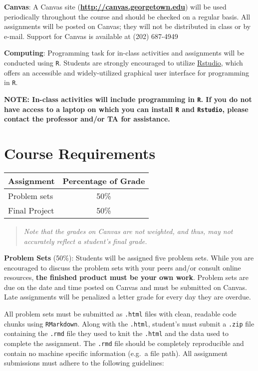 \documentclass[
  12pt,
]{article}
\begin{document}
\textbf{Canvas}: A Canvas site
(\textbf{\url{http://canvas.georgetown.edu}}) will be used periodically
throughout the course and should be checked on a regular basis. All
assignments will be posted on Canvas; they will not be distributed in
class or by e-mail. Support for Canvas is available at (202) 687-4949

\textbf{Computing}: Programming task for in-class activities and
assignments will be conducted using \texttt{R}. Students are strongly
encouraged to utilize
\href{https://www.rstudio.com/products/rstudio/download/}{Rstudio},
which offers an accessible and widely-utilized graphical user interface
for programming in \texttt{R}.

\textbf{NOTE: In-class activities will include programming in
\texttt{R}. If you do not have access to a laptop on which you can
install \texttt{R} and \texttt{Rstudio}, please contact the professor
and/or TA for assistance.}

\hypertarget{course-requirements}{%
\section{Course Requirements}\label{course-requirements}}

\begin{longtable}[]{@{}lc@{}}
\toprule
\textbf{Assignment} & \textbf{Percentage of Grade}\tabularnewline
\midrule
\endhead
Problem sets & 50\%\tabularnewline
Final Project & 50\%\tabularnewline
\bottomrule
\end{longtable}

\begin{quote}
\emph{Note that the grades on Canvas are not weighted, and thus, may not
accurately reflect a student's final grade.}
\end{quote}

\textbf{Problem Sets} (50\%): Students will be assigned five problem
sets. While you are encouraged to discuss the problem sets with your
peers and/or consult online resources, \textbf{the finished product must
be your own work}. Problem sets are due on the date and time posted on
Canvas and must be submitted on Canvas. Late assignments will be
penalized a letter grade for every day they are overdue.

All problem sets must be submitted as \texttt{.html} files with clean,
readable code chunks using \texttt{RMarkdown}. Along with the
\texttt{.html}, student's must submit a \texttt{.zip} file containing
the \texttt{.rmd} file they used to knit the \texttt{.html} and the data
used to complete the assignment. The \texttt{.rmd} file should be
completely reproducible and contain no machine specific information
(e.g.~a file path). All assignment submissions must adhere to the
following guidelines:
\end{document}
